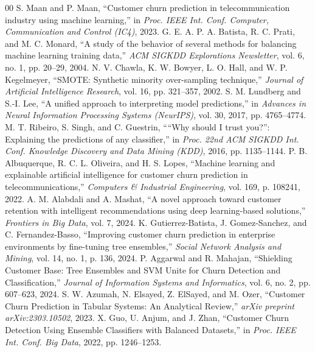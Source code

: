 \documentclass[conference]{IEEEtran}
\begin{document}
\begin{thebibliography}{00}
 S. Maan and P. Maan, ``Customer churn prediction in telecommunication industry using machine learning,'' in \textit{Proc. IEEE Int. Conf. Computer, Communication and Control (IC4)}, 2023.
 G. E. A. P. A. Batista, R. C. Prati, and M. C. Monard, ``A study of the behavior of several methods for balancing machine learning training data,'' \textit{ACM SIGKDD Explorations Newsletter}, vol. 6, no. 1, pp. 20--29, 2004.
 N. V. Chawla, K. W. Bowyer, L. O. Hall, and W. P. Kegelmeyer, ``SMOTE: Synthetic minority over-sampling technique,'' \textit{Journal of Artificial Intelligence Research}, vol. 16, pp. 321--357, 2002.
 S. M. Lundberg and S.-I. Lee, ``A unified approach to interpreting model predictions,'' in \textit{Advances in Neural Information Processing Systems (NeurIPS)}, vol. 30, 2017, pp. 4765--4774.
 M. T. Ribeiro, S. Singh, and C. Guestrin, ````Why should I trust you?'': Explaining the predictions of any classifier,'' in \textit{Proc. 22nd ACM SIGKDD Int. Conf. Knowledge Discovery and Data Mining (KDD)}, 2016, pp. 1135--1144.
 P. B. Albuquerque, R. C. L. Oliveira, and H. S. Lopes, ``Machine learning and explainable artificial intelligence for customer churn prediction in telecommunications,'' \textit{Computers \& Industrial Engineering}, vol. 169, p. 108241, 2022.
 A. M. Alabdali and A. Mashat, ``A novel approach toward customer retention with intelligent recommendations using deep learning-based solutions,'' \textit{Frontiers in Big Data}, vol. 7, 2024.
 K. Gutierrez-Batista, J. Gomez-Sanchez, and C. Fernandez-Basso, ``Improving customer churn prediction in enterprise environments by fine-tuning tree ensembles,'' \textit{Social Network Analysis and Mining}, vol. 14, no. 1, p. 136, 2024.
 P. Aggarwal and R. Mahajan, ``Shielding Customer Base: Tree Ensembles and SVM Unite for Churn Detection and Classification,'' \textit{Journal of Information Systems and Informatics}, vol. 6, no. 2, pp. 607--623, 2024.
 S. W. Azumah, N. Elsayed, Z. ElSayed, and M. Ozer, ``Customer Churn Prediction in Tabular Systems: An Analytical Review,'' \textit{arXiv preprint arXiv:2303.10502}, 2023.
 X. Guo, U. Anjum, and J. Zhan, ``Customer Churn Detection Using Ensemble Classifiers with Balanced Datasets,'' in \textit{Proc. IEEE Int. Conf. Big Data}, 2022, pp. 1246--1253.
\end{thebibliography}
\end{document}
